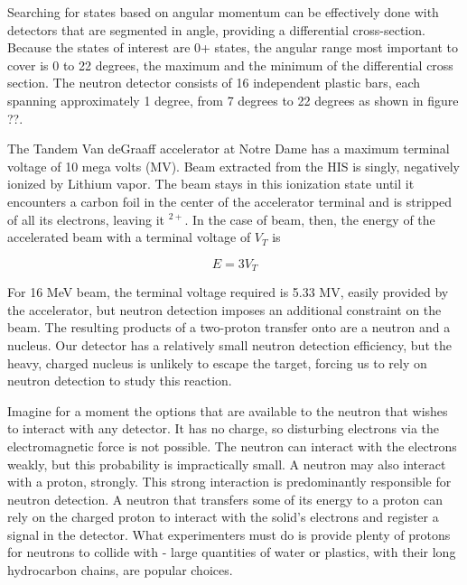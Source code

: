 Searching for states based on angular momentum can be effectively done with detectors that are segmented in angle, providing a differential cross-section.  Because the states of interest are 0+ states, the angular range most important to cover is 0 to 22 degrees, the maximum and the minimum of the differential cross section.  The neutron detector consists of 16 independent plastic bars, each spanning approximately 1 degree, from 7 degrees to 22 degrees as shown in figure ??.


The Tandem Van deGraaff accelerator at Notre Dame has a maximum terminal voltage of 10 mega volts (MV).  Beam extracted from the HIS is singly, negatively ionized by Lithium vapor.  The beam stays in this ionization state until it encounters a carbon foil in the center of the accelerator terminal and is stripped of all its electrons, leaving it $^{2+}$.  In the case of  beam, then, the energy of the accelerated beam with a terminal voltage of $V_T$ is 

\begin{equation}
E = 3V_T
\end{equation}

For 16 MeV  beam, the terminal voltage required is 5.33 MV, easily provided by the accelerator, but neutron detection imposes an additional constraint on the beam.  The resulting products of a two-proton transfer onto  are a neutron and a  nucleus.  Our detector has a relatively small neutron detection efficiency, but the heavy, charged  nucleus is unlikely to escape the target, forcing us to rely on neutron detection to study this reaction.  

Imagine for a moment the options that are available to the neutron that wishes to interact with any detector.  It has no charge, so disturbing electrons via the electromagnetic force is not possible.  The neutron can interact with the electrons weakly, but this probability is impractically small.  A neutron may also interact with a proton, strongly.  This strong interaction is predominantly responsible for neutron detection.  A neutron that transfers some of its energy to a proton can rely on the charged proton to interact with the solid's electrons and register a signal in the detector.  What experimenters must do is provide plenty of protons for neutrons to collide with - large quantities of water or plastics, with their long hydrocarbon chains, are popular choices.

